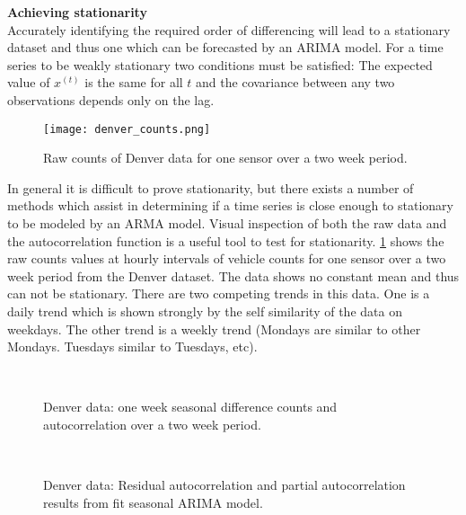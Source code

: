 \bigskip
\noindent \textbf{Achieving stationarity} \\
Accurately identifying the required order of differencing will lead to a stationary dataset and thus one which can be forecasted by an ARIMA model.  For a time series to be weakly stationary two conditions must be satisfied: The expected value of $x^{(t)}$ is the same for all $t$ and the covariance between any two observations depends only on the lag.  

\begin{figure}[]
	\begin{center}
		\texttt{[image: denver\_counts.png]}
	\end{center}
	\caption{Raw counts of Denver data for one sensor over a two week period.}
	\label{fig:denver_raw_data}
\end{figure}

In general it is difficult to prove stationarity, but there exists a number of methods which assist in determining if a time series is close enough to stationary to be modeled by an ARMA model.  Visual inspection of both the raw data and the autocorrelation function is a useful tool to test for stationarity.  \ref{fig:denver_raw_data} shows the raw counts values at hourly intervals of vehicle counts for one sensor over a two week period from the Denver dataset.  The data shows no constant mean and thus can not be stationary.  There are two competing trends in this data.  One is a daily trend which is shown strongly by the self similarity of the data on weekdays.  The other trend is a weekly trend (Mondays are similar to other Mondays.  Tuesdays similar to Tuesdays, etc).

\begin{figure}[!t]
\begin{center}
 \\
\end{center}
\caption{Denver data: one week seasonal difference counts and autocorrelation over a two week period.}
\label{fig:lag_data}
\end{figure}

\begin{figure}[!t]
\begin{center}
 \\
\end{center}
\caption{Denver data: Residual autocorrelation and partial autocorrelation results from fit seasonal ARIMA model.}
\label{fig:fit_lag_data}
\end{figure}



